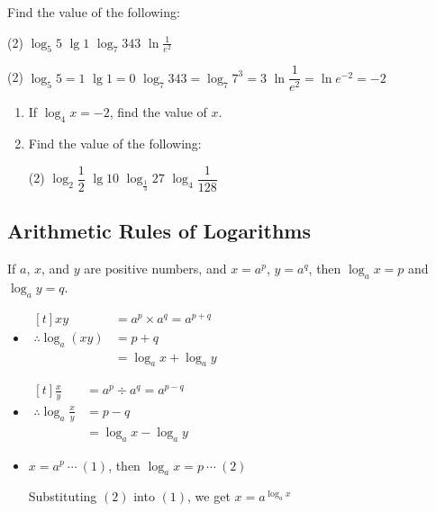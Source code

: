 \documentclass{report}
\begin{document}
        \begin{question}
            Find the value of the following:
            \begin{tasks}[label=(\alph*)](2)
                \task $\log _5 5$
                \task $\lg 1$
                \task $\log _7 343$
                \task $\ln \frac{1}{e^2}$
            \end{tasks}

            \sol{}
            \begin{tasks}[label=(\alph*)](2)
                \task $\log _5 5=1$
                \task $\lg 1=0$
                \task $\log _7 343=\log _7 7^3=3$
                \task $\ln \dfrac{1}{e^2}=\ln e^{-2}=-2$
            \end{tasks}
        \end{question}

        \begin{enumerate}
            \item If $\log_4 x = -2$, find the value of $x$.
            \item Find the value of the following:
            \begin{tasks}[label=(\alph*)](2)
                \task $\log_2 \dfrac{1}{2}$
                \task $\lg 10$
                \task $\log_\frac{1}{3} 27$
                \task $\log_4 \dfrac{1}{128}$
            \end{tasks}
        \end{enumerate}

        \subsection*{Arithmetic Rules of Logarithms}

        If $a$, $x$, and $y$ are positive numbers, and $x = a^p$, $y = a^q$, then $\log_a x = p$ and $\log_a y = q$. 
        
        \begin{itemize}
            \item $\begin{aligned}[t] x y & =a^p \times a^q=a^{p+q} \\ \therefore \log _a(x y) & =p+q \\ & =\log _a x+\log _a y\end{aligned}$
            \item $\begin{aligned}[t] \frac{x}{y} & =a^p \div a^q=a^{p-q} \\ \therefore \log _a \frac{x}{y} & =p-q \\ & =\log _a x-\log _a y\end{aligned}$
            \item $x=a^p\ \cdots\ (1)$, then $\log _a x=p\ \cdots\ (2)$
            
            Substituting $(2)$ into $(1)$, we get $x=a^{\log _a x}$
        \end{itemize}
\end{document}
